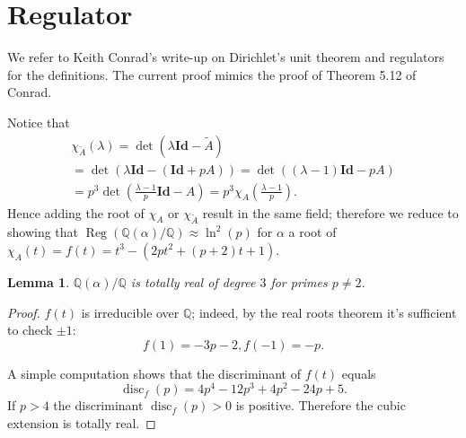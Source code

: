 \documentclass[a4paper]{article}
\newtheorem{Lem}[Thm]{Lemma}
\newcommand{\Q}{\mathbb{Q}}        %
\newcommand{\Id}{\mathbf{Id}}        %
\DeclareMathOperator{\Reg}{Reg}        %
\DeclareMathOperator{\disc}{disc}        %
\begin{document}
\section{Regulator}
We refer to Keith Conrad's write-up on Dirichlet's unit theorem and regulators \cite{conraddirichlet} for the definitions.
The current proof mimics the proof of Theorem 5.12 of Conrad.

Notice that 
\begin{multline}
\chi_{\tilde A}(\lambda) 
= \det(\lambda \Id - \tilde A) \\
= \det(\lambda \Id - (\Id + p A))
= \det((\lambda - 1) \Id - p A)\\
= p^3 \det(\frac{\lambda - 1}p \Id - A)
= p^3 \chi_A(\frac{\lambda - 1}p)
.\end{multline}
Hence adding the root of $\chi_{A}$ or $\chi_{\tilde A}$ result in the same field; therefore we reduce to showing that 
$\Reg ( \Q(\alpha)/\Q ) \approx \ln^2(p) $ for $\alpha$ a root of $\chi_{A}(t) = f(t) = t^3 - (2p t^2 + (p + 2) t + 1) $.

\begin{Lem}
$\Q(\alpha)/\Q$ is totally real of degree $3$ for primes $p \ne 2$.
\end{Lem}
\begin{proof}
$f(t)$ is irreducible over $\Q$; indeed, by the real roots theorem it's sufficient to check $\pm 1$:
$$f(1) = - 3 p - 2, f(-1) = - p .$$

A simple computation shows that the discriminant of $f(t)$ equals 
\[
	\disc_f(p) = 4 p^4 - 12 p^3 + 4 p^2 - 24 p + 5
.\]
If $p > 4$ the discriminant  $\disc_f(p) > 0$ is positive.
Therefore the cubic extension is totally real.
\end{proof}
\end{document}
